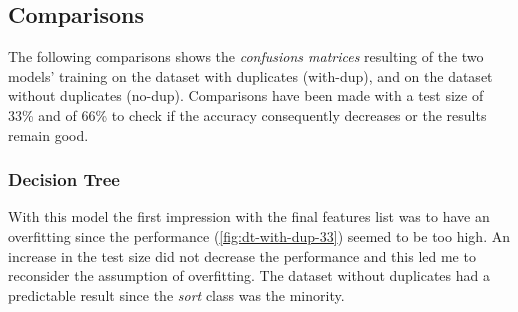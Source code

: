 \documentclass[11pt]{article}
\begin{document}
	\subsection{Comparisons}
	The following comparisons shows the \textit{confusions matrices} resulting
	of the two models' training on the dataset with duplicates (with-dup), and
	on the dataset without duplicates (no-dup).
	Comparisons have been made with a test size of 33\% and of 66\% to check if
	the accuracy consequently decreases or the results remain good.
	
	\subsubsection{Decision Tree}
	With this model the first impression with the final features list
	was to have an overfitting since the performance (\autoref{fig:dt-with-dup-33})
	seemed to be too high.
	An increase in the test size did not decrease the performance and this led me
	to reconsider the assumption of overfitting.
	The dataset without duplicates had a predictable result since the \textit{sort}
	class was the minority. 
\end{document}
